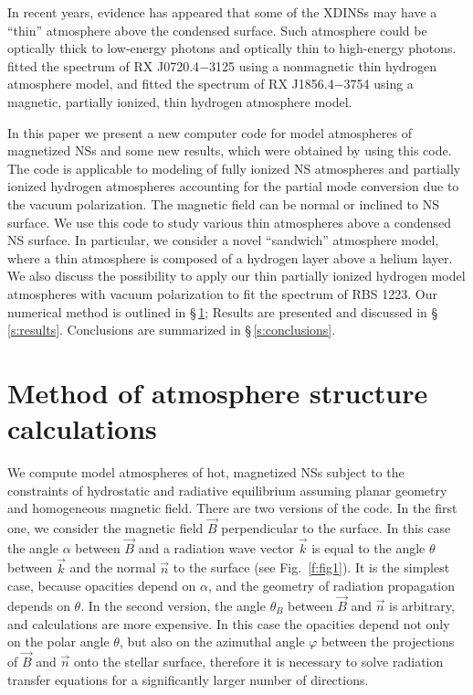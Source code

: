\documentclass{aa}
\begin{document}
In recent years, evidence has appeared that some of the XDINSs 
may have a ``thin'' atmosphere above the condensed surface. 
Such atmosphere could be optically thick to low-energy photons and optically 
thin to high-energy photons. 
\citet{Motchetal:03} fitted the spectrum of RX J0720.4$-$3125 
using a nonmagnetic thin hydrogen atmosphere model, 
and \citet{Hoetal:07} fitted the spectrum of RX J1856.4$-$3754 
using a magnetic, partially ionized, thin hydrogen atmosphere model. 
 
In this paper we present a new computer code for model atmospheres of 
magnetized NSs and some new results, which were obtained by using this 
code. The code is applicable to modeling of fully ionized 
NS atmospheres and partially ionized hydrogen atmospheres  
accounting for the partial 
mode conversion due to the 
vacuum polarization. The
magnetic field can be normal or inclined to NS surface. 
We use this code to study various thin atmospheres above 
a condensed NS surface. 
In particular, we consider a novel ``sandwich'' atmosphere 
model, where a thin atmosphere is composed of a hydrogen 
layer above a helium layer. 
 We also discuss the possibility to apply our thin 
partially ionized hydrogen model atmospheres with vacuum polarization 
to fit the spectrum of RBS 1223.
Our numerical method is outlined in \S\,\ref{s:methods}; 
Results are presented and discussed in \S\,\ref{s:results}. 
Conclusions are summarized in \S\,\ref{s:conclusions}. 
 
 
\section{Method of atmosphere structure calculations} 
\label{s:methods} 
 
We compute model 
atmospheres of hot, magnetized NSs subject to the constraints 
of hydrostatic and radiative equilibrium assuming planar geometry 
and homogeneous magnetic field. 
There are two versions of the code. 
In the first one, we consider the magnetic field 
$\vec{B}$ perpendicular to the surface.  In 
this case the angle $\alpha$ between $\vec{B}$ and a radiation 
wave vector $\vec{k}$ is equal to the angle $\theta$ between 
$\vec{k}$ and the normal $\vec{n}$ to the surface 
(see Fig.~\ref{f:fig1}). 
It is the simplest case, 
because opacities depend on $\alpha$, and the geometry of radiation 
propagation depends on $\theta$.  In the second version, the angle 
$\theta_B$ between $\vec{B}$ and $\vec{n}$ is arbitrary, 
and calculations are more expensive. In this case the 
opacities depend not only on the polar angle 
$\theta$, but also on the azimuthal angle 
$\varphi$ between the projections of $\vec{B}$ and $\vec{n}$ 
onto the stellar surface, therefore it is necessary to solve radiation 
transfer equations for a significantly larger number of directions. 
 
\end{document}
